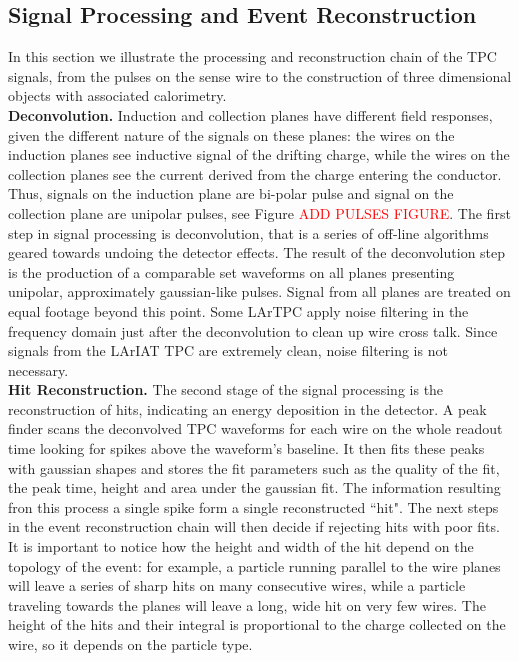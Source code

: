 \subsection{Signal Processing and Event Reconstruction}
In this section we illustrate the processing and reconstruction chain of the TPC signals, from the pulses on the sense wire to the construction of three dimensional objects with associated calorimetry.\\

\textbf{Deconvolution.} Induction and collection planes have different field responses, given the different nature of the signals on these planes: the wires on the induction planes see inductive signal of the drifting charge, while the wires on the collection planes see the current derived from the charge entering the conductor. Thus, signals on the induction plane are bi-polar pulse and signal on the collection plane are unipolar pulses, see Figure \textcolor{red}{ADD PULSES FIGURE}. The first step in signal processing is deconvolution, that is a series of off-line algorithms geared towards undoing the detector effects. The result of the deconvolution step is  the production of  a comparable set waveforms on all planes presenting unipolar, approximately gaussian-like pulses. Signal from all planes are treated on equal footage beyond this point. Some LArTPC apply noise filtering in the frequency domain just after the deconvolution to clean up wire cross talk. Since signals from the LArIAT TPC are extremely clean, noise filtering is not necessary.\\


\textbf{Hit Reconstruction.} The second stage of the signal processing is the reconstruction of hits, indicating an energy deposition in the detector.  A peak finder scans the deconvolved TPC waveforms for each wire on the whole readout time looking for spikes  above  the waveform's baseline. It then fits these peaks with gaussian shapes and stores the fit parameters such as the quality of the fit, the peak time, height and area under the gaussian fit. The information resulting fron this process a single spike form a single reconstructed ``hit".
The next steps in the event reconstruction chain will then decide if rejecting hits with poor fits.
It is important to notice how the height and width of the hit depend on the topology of the event: for example, a particle running  parallel to the wire planes will leave a series of sharp hits on many consecutive wires, while a particle traveling towards the planes will leave a long, wide hit on very few wires. The height of the hits and their integral is proportional to the charge collected on the wire, so it depends on the particle type.

